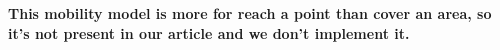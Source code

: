 






\textbf{This mobility model is more for reach a point than cover an area, so it's not present in our article and we don't implement it.}

\newpage


